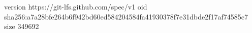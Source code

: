 version https://git-lfs.github.com/spec/v1
oid sha256:a7a28bfe264b6f942bd60ed584204584fa41930378f7e31dbde2f17af74585c7
size 349692
